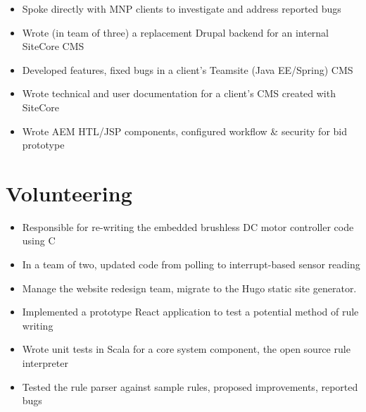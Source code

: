 \documentclass[]{rcf_cv}
\begin{document}
		\begin{itemize}
			\setlength\itemsep{-0.4em}
			\renewcommand\labelitemi{--}
			
			\item Spoke directly with MNP clients to investigate and address reported bugs
			\item Wrote (in team of three) a replacement Drupal backend for an internal SiteCore CMS
			\item Developed features, fixed bugs in a client's Teamsite (Java EE/Spring) CMS
			\item Wrote technical and user documentation for a client's CMS created with SiteCore 
			\item Wrote AEM HTL/JSP components, configured workflow \& security for bid prototype

			
		\end{itemize}
	
	\section{Volunteering}
	
		\begin{itemize}
			\setlength\itemsep{-0.4em}
			\renewcommand\labelitemi{--}
			
			\item Responsible for re-writing the embedded brushless DC motor controller code using C
			\item In a team of two, updated code from polling to interrupt-based sensor reading
			\item Manage the website redesign team, migrate to the Hugo static site generator.
			
		\end{itemize}
	
		\begin{itemize}
			\setlength\itemsep{-0.4em}
			\renewcommand\labelitemi{--}
			
			\item Implemented a prototype React application to test a potential method of rule writing
			\item Wrote unit tests in Scala for a core system component, the open source rule interpreter
			\item Tested the rule parser against sample rules, proposed improvements, reported bugs

		\end{itemize}
\end{document}
